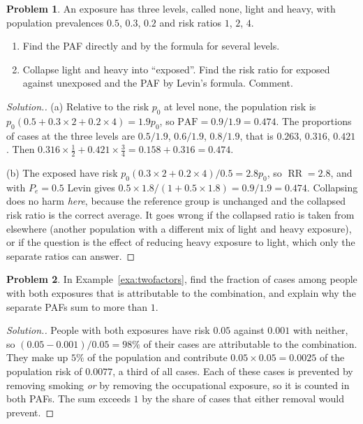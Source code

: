 \documentclass[11pt,a4paper]{article}
\numberwithin{equation}{section}
\DeclareMathOperator{\RR}{RR}
\theoremstyle{definition}
\newtheorem{problemx}{Problem}[subsection]
\newenvironment{problem}{\begin{problemx}}{\end{problemx}}
\newenvironment{solution}
  {\renewcommand{\qedsymbol}{}\begin{proof}[\textit{Solution}.]}
  {\end{proof}}
\begin{document}
\begin{problem}
\label{prob:levels}
An exposure has three levels, called none, light and heavy, with population prevalences $0.5$, $0.3$, $0.2$ and risk ratios $1$, $2$, $4$.
\begin{enumerate}[label=(\alph*)]
\item Find the PAF directly and by the formula for several levels.
\item Collapse light and heavy into ``exposed''. Find the risk ratio for exposed against unexposed and the PAF by Levin's formula. Comment.
\end{enumerate}
\end{problem}

\begin{solution}
(a) Relative to the risk $p_0$ at level none, the population risk is $p_0(0.5 + 0.3 \times 2 + 0.2 \times 4) = 1.9p_0$, so $\text{PAF} = 0.9/1.9 = 0.474$. The
proportions of cases at the three levels are $0.5/1.9$, $0.6/1.9$, $0.8/1.9$, that is $0.263$, $0.316$, $0.421$. Then
$0.316 \times \tfrac12 + 0.421 \times \tfrac34 = 0.158 + 0.316 = 0.474$.

(b) The exposed have risk $p_0(0.3 \times 2 + 0.2 \times 4)/0.5 = 2.8p_0$, so $\RR = 2.8$, and with $P_e = 0.5$ Levin gives $0.5 \times 1.8/(1 + 0.5 \times 1.8) = 0.9/1.9 = 0.474$.
Collapsing does no harm \emph{here}, because the reference group is unchanged and the collapsed risk ratio is the correct average.
It goes wrong if the collapsed ratio is taken from elsewhere (another population with a different mix of light and heavy exposure), or
if the question is the effect of reducing heavy exposure to light, which only the separate ratios can answer.
\end{solution}

\begin{problem}
In Example~\ref{exa:twofactors}, find the fraction of cases among people with both exposures that is attributable to the combination,
and explain why the separate PAFs sum to more than $1$.
\end{problem}

\begin{solution}
People with both exposures have risk $0.05$ against $0.001$ with neither, so $(0.05 - 0.001)/0.05 = 98\%$ of their cases are attributable to the
combination. They make up $5\%$ of the population and contribute $0.05 \times 0.05 = 0.0025$ of the population risk of $0.0077$, a third of all
cases. Each of these cases is prevented by removing smoking \emph{or} by removing the occupational exposure, so it is counted in both
PAFs. The sum exceeds $1$ by the share of cases that either removal would prevent.
\end{solution}
\end{document}
